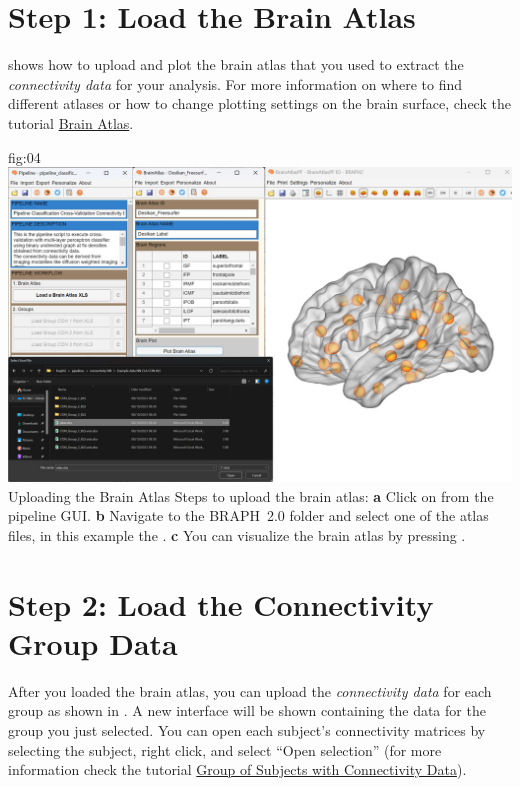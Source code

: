 \documentclass[justified]{tufte-handout}
\begin{document}
{\clearpage
\section{Step 1: Load the Brain Atlas}

 shows how to upload and plot the brain atlas that you used to extract the \emph{connectivity data} for your analysis. For more information on where to find different atlases or how to change plotting settings on the brain surface, check the tutorial \href{https://github.com/braph-software/BRAPH-2/tree/develop/tutorials/general/tut_ba}{Brain Atlas}.

	{fig:04}
	{
	\includegraphics{fig04.jpg}
	}
	{Uploading the Brain Atlas}
	{
	Steps to upload the brain atlas:
	{\bf a} Click on  from the pipeline GUI.
	{\bf b} Navigate to the BRAPH~2.0 folder  and select one of the atlas files, in this example the . 
	{\bf c} You can visualize the brain atlas by pressing . 
	}
 
\clearpage
\section{Step 2: Load the Connectivity Group Data}

After you loaded the brain atlas, you can upload the \emph{connectivity data} for each group as shown in . A new interface will be shown containing the data for the group you just selected. You can open each subject’s connectivity matrices by selecting the subject, right click, and select “Open selection” (for more information check the tutorial \href{https://github.com/braph-software/BRAPH-2/tree/develop/tutorials/general/tut_gr_con}{Group of Subjects with Connectivity Data}).

}
\end{document}
